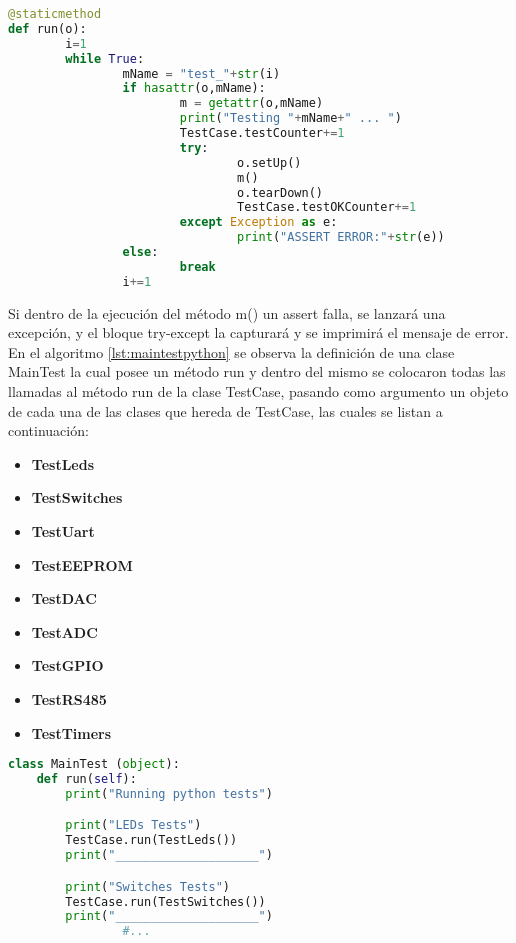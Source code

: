 \begin{lstlisting}[label={lst:utestsrun},caption=Método que ejecuta los métodos de test en la biblioteca unittest.py implementada., language={python}]
@staticmethod
def run(o):
		i=1
		while True:
				mName = "test_"+str(i)
				if hasattr(o,mName):
						m = getattr(o,mName)
						print("Testing "+mName+" ... ")
						TestCase.testCounter+=1
						try:
								o.setUp()
								m()
								o.tearDown()
								TestCase.testOKCounter+=1
						except Exception as e:
								print("ASSERT ERROR:"+str(e))
				else:
						break
				i+=1
\end{lstlisting}

Si dentro de la ejecución del método m() un assert falla, se lanzará una excepción, y el bloque try-except la capturará y se imprimirá el mensaje de error. En el algoritmo \ref{lst:maintestpython} se observa la definición de una clase MainTest la cual posee un método run y dentro del mismo se colocaron todas las llamadas al método run de la clase TestCase, pasando como argumento un objeto de cada una de las clases que hereda de TestCase, las cuales se listan a continuación:

\begin{itemize}
	\item \textbf{TestLeds}
	\item \textbf{TestSwitches}
	\item \textbf{TestUart}
	\item \textbf{TestEEPROM}
	\item \textbf{TestDAC}
	\item \textbf{TestADC}
	\item \textbf{TestGPIO}
	\item \textbf{TestRS485}	
	\item \textbf{TestTimers}
\end{itemize}

\begin{lstlisting}[label={lst:maintestpython},caption=Clase MainTest desde donde se ejecutan todos los tests Python., language={python}]
class MainTest (object):
    def run(self):
        print("Running python tests")

        print("LEDs Tests")
        TestCase.run(TestLeds())
        print("____________________")

        print("Switches Tests")
        TestCase.run(TestSwitches())
        print("____________________")
				#...
\end{lstlisting}
 

